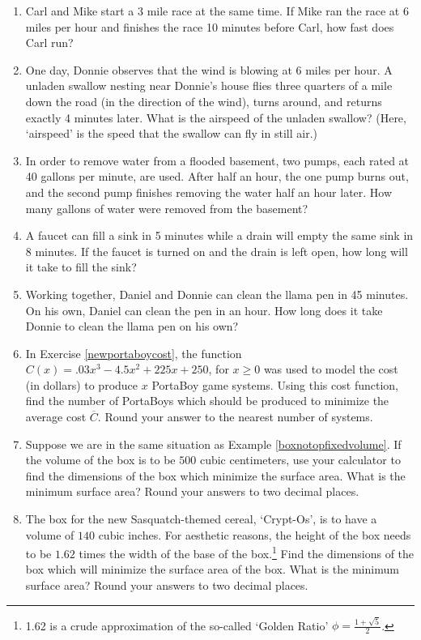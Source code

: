 \begin{enumerate}
\setcounter{enumi}{\value{HW}}


\item  Carl and Mike start a 3 mile race at the same time.  If Mike ran the race at 6 miles per hour and finishes the race 10 minutes before Carl, how fast does Carl run?

\item  One day, Donnie observes that the wind is blowing at 6 miles per hour.  A unladen swallow nesting near Donnie's house flies three quarters of a mile down the road (in the direction of the wind), turns around, and returns exactly 4 minutes later.  What is the airspeed of the unladen swallow?  (Here, `airspeed' is the speed that the swallow can fly in still air.) 

\item  In order to remove water from a flooded basement, two pumps, each rated at 40 gallons per minute, are used. After half an hour, the one pump burns out, and the second pump finishes removing the water half an hour later.  How many gallons of water were removed from the basement?

\item  A faucet can fill a sink in 5 minutes while a drain will empty the same sink in 8 minutes.  If the faucet is turned on and the drain is left open, how long will it take to fill the sink?

\item Working together, Daniel and Donnie can clean the llama pen in 45 minutes.  On his own, Daniel can clean the pen in an hour.  How long does it take Donnie to clean the llama pen on his own?

\item  In Exercise \ref{newportaboycost}, the function $C(x) = .03x^{3} - 4.5x^{2} + 225x + 250$, for $x \geq 0$ was used to model the cost (in dollars) to produce $x$ PortaBoy game systems. Using this cost function, find the number of PortaBoys which should be produced to minimize the average cost $\overline{C}$.  Round your answer to the nearest number of systems. 

\item  Suppose we are in the same situation as Example \ref{boxnotopfixedvolume}.  If the volume of the box is to be $500$ cubic centimeters, use your calculator to find the dimensions of the box which minimize the surface area.  What is the minimum surface area?  Round your answers to two decimal places.

\item  The box for the new Sasquatch-themed cereal, `Crypt-Os', is to have a volume of $140$ cubic inches.  For aesthetic reasons, the height of the box needs to be $1.62$ times the width of the base of the box.\footnote{1.62 is a crude approximation of the so-called `Golden Ratio' $\phi = \frac{1 + \sqrt{5}}{2}$.}  Find the dimensions of the box which will minimize the surface area of the box.  What is the minimum surface area?  Round your answers to two decimal places.   


\end{enumerate}

